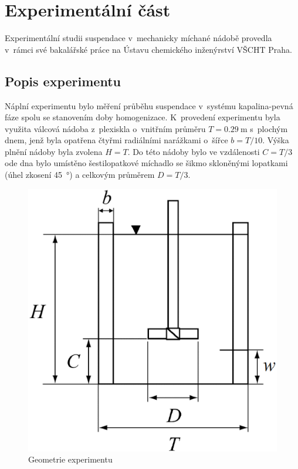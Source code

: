 \chapter{Experimentální část}
Experimentální studii suspendace v~mechanicky míchané nádobě provedla \citet{pav11} v~rámci své bakalářské práce na Ústavu chemického inženýrství VŠCHT Praha.

\section{Popis experimentu}
\label{chap:exp}
Náplní experimentu bylo měření průběhu suspendace v~systému kapalina-pevná fáze spolu se stanovením doby homogenizace. K~provedení experimentu byla využita válcová nádoba z~plexiskla o~vnitřním průměru $T=\SI{0.29}{\meter}$ s~plochým dnem, jenž byla opatřena čtyřmi radiálními narážkami o~šířce $b=T/10$. Výška plnění nádoby byla zvolena \mbox{$H=T$}. Do této nádoby bylo ve vzdálenosti $C=T/3$ ode dna bylo umístěno šesti\-lo\-pat\-ko\-vé míchadlo se šikmo skloněnými lopatkami (úhel zkosení \SI{45}{\degree}) a celkovým průměrem  $D=T/3$. 
\begin{figure}[h!]
\centering
\includegraphics[scale=0.44]{images/mujedit.eps}
\caption{Geometrie experimentu}
\label{fig:nadoba}
\end{figure} 
